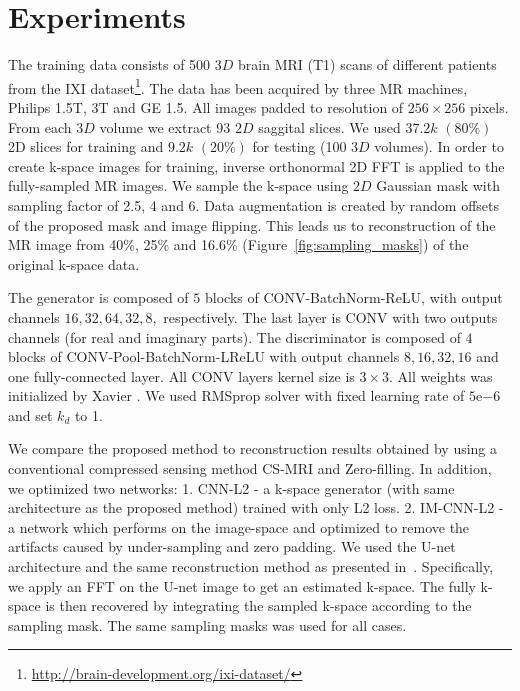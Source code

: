 \documentclass[review]{elsarticle}
\begin{document}
\section{Experiments}\label{experiments_section}

The training data consists of 500 $3D$ brain MRI (T1) scans of different patients from the IXI dataset\footnote{\url{http://brain-development.org/ixi-dataset/}}. The data has been acquired by three MR machines, Philips 1.5T, 3T and GE 1.5. All images padded to resolution of $256\times256$ pixels.
From each $3D$ volume we extract 93 $2D$ saggital slices. We used $37.2k$ $(80\%)$ 2D slices for training and $9.2k$ $(20\%)$ for testing (100 $3D$ volumes).
In order to create k-space images for training, inverse orthonormal
2D FFT is applied to the fully-sampled MR images. We sample the k-space
using $2D$ Gaussian mask with sampling factor of 2.5, 4 and 6. Data augmentation
is created by random offsets of the proposed mask and image flipping.
This leads us to reconstruction of the MR image from 40\%, 25\% and 16.6\% (Figure~\ref{fig:sampling_masks}) of
the original k-space data.

The generator is composed of $5$ blocks of CONV-BatchNorm-ReLU, with output channels $16,32,64,32,8,$ respectively. The last layer is CONV with two outputs channels (for real and imaginary parts). The discriminator is composed of $4$ blocks of CONV-Pool-BatchNorm-LReLU with output channels $8,16,32,16$ and one fully-connected layer. All CONV layers kernel size is $3\times3$. All weights was initialized by Xavier \cite{glorot2010understanding}. We used RMSprop solver with fixed learning rate of $5\mathrm{e}{-6}$ and set $k_{d}$ to 1.

We compare the proposed method to reconstruction results obtained by using a conventional compressed sensing method CS-MRI \cite{lustig2007sparse} and Zero-filling. In addition, we optimized two networks: 1. CNN-L2 - a k-space generator (with same architecture as the proposed method) trained with only L2 loss. 2. IM-CNN-L2 - a network which performs on the image-space and optimized to remove the artifacts caused by under-sampling and zero padding. 
We used the U-net \cite{ronneberger2015u} architecture and the same reconstruction method as presented in~\cite{hyun2017deep}. Specifically, we apply an FFT on the U-net image to get an estimated k-space. The fully k-space is then recovered by integrating the sampled k-space according to the sampling mask.
The same sampling masks was used for all cases.
\end{document}
